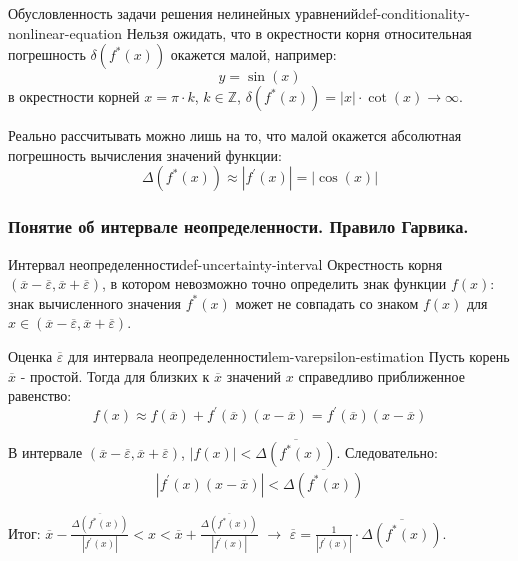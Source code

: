 \documentclass[14pt]{extarticle}
\begin{document}
        \begin{definition}{Обусловленность задачи решения нелинейных уравнений}{def-conditionality-nonlinear-equation}
            Нельзя ожидать, что в окрестности корня относительная погрешность $\delta(f^{*}(x))$ окажется малой, например:\\ 
            $$y = \sin(x)$$ 
            в окрестности корней $x = \pi \cdot k$, $k \in \mathbb{Z}$, $\delta(f^{*}(x)) = |x| \cdot \cot(x) \to \infty$. 
        
            \vspace{\baselineskip}
        
            Реально рассчитывать можно лишь на то, что малой окажется абсолютная погрешность вычисления значений функции:
            $$\Delta(f^{*}(x)) \approx |f^{'}(x)| = |\cos(x)|$$
        \end{definition}

    \subsubsection{Понятие об интервале неопределенности. Правило Гарвика.}

        \begin{definition}{Интервал неопределенности}{def-uncertainty-interval}
            Окрестность корня $(\overline{x} - \overline{\varepsilon}, \overline{x} + \overline{\varepsilon})$, в котором невозможно точно определить знак функции $f(x)$: знак вычисленного значения $f^{*}(x)$ может не совпадать со знаком $f(x)$ для $x \in (\overline{x} - \overline{\varepsilon}, \overline{x} + \overline{\varepsilon})$.
        \end{definition}

        \begin{lemma}{Оценка $\overline{\varepsilon}$ для интервала неопределенности}{lem-varepsilon-estimation}
            Пусть корень $\overline{x}$ - простой. Тогда для близких к $\overline{x}$ значений $x$ справедливо приближенное равенство:
            $$f(x) \approx f(\overline{x}) + f^{'}(\overline{x})(x - \overline{x}) = f^{'}(\overline{x})(x - \overline{x})$$
        
            В интервале $(\overline{x} - \overline{\varepsilon}, \overline{x} + \overline{\varepsilon})$, $|f(x)| < \overline{\Delta(f^{*}(x))}$. Следовательно:
            $$|f^{'}(x)(x - \overline{x})| < \overline{\Delta(f^{*}(x))}$$

            Итог: $\overline{x} - \frac{\overline{\Delta(f^{*}(x))}}{|f^{'}(x)|} < x < \overline{x} + \frac{\overline{\Delta(f^{*}(x))}}{|f^{'}(x)|}$ $\rightarrow$ $\overline{\varepsilon} = \frac{1}{|f^{'}(x)|} \cdot \overline{\Delta(f^{*}(x))}$.
        \end{lemma}
\end{document}
